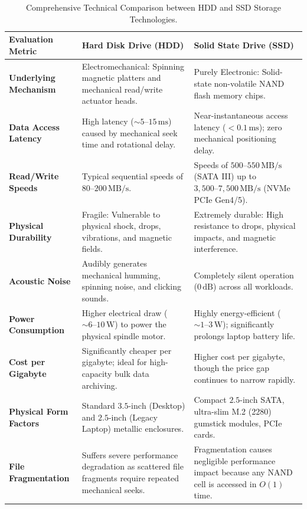 \begin{table}[htbp]
\centering
\small
\renewcommand{\arraystretch}{1.3}
\begin{tabularx}{\linewidth}{l>{\raggedright\arraybackslash}X>{\raggedright\arraybackslash}X}
\toprule
\textbf{Evaluation Metric} & \textbf{Hard Disk Drive (HDD)} & \textbf{Solid State Drive (SSD)} \\
\midrule
\textbf{Underlying Mechanism} & Electromechanical: Spinning magnetic platters and mechanical read/write actuator heads. & Purely Electronic: Solid-state non-volatile NAND flash memory chips. \\
\textbf{Data Access Latency} & High latency ($\sim 5\text{--}15\,\text{ms}$) caused by mechanical seek time and rotational delay. & Near-instantaneous access latency ($< 0.1\,\text{ms}$); zero mechanical positioning delay. \\
\textbf{Read/Write Speeds} & Typical sequential speeds of $80\text{--}200\,\text{MB/s}$. & Speeds of $500\text{--}550\,\text{MB/s}$ (SATA III) up to $3{,}500\text{--}7{,}500\,\text{MB/s}$ (NVMe PCIe Gen4/5). \\
\textbf{Physical Durability} & Fragile: Vulnerable to physical shock, drops, vibrations, and magnetic fields. & Extremely durable: High resistance to drops, physical impacts, and magnetic interference. \\
\textbf{Acoustic Noise} & Audibly generates mechanical humming, spinning noise, and clicking sounds. & Completely silent operation ($0\,\text{dB}$) across all workloads. \\
\textbf{Power Consumption} & Higher electrical draw ($\sim 6\text{--}10\,\text{W}$) to power the physical spindle motor. & Highly energy-efficient ($\sim 1\text{--}3\,\text{W}$); significantly prolongs laptop battery life. \\
\textbf{Cost per Gigabyte} & Significantly cheaper per gigabyte; ideal for high-capacity bulk data archiving. & Higher cost per gigabyte, though the price gap continues to narrow rapidly. \\
\textbf{Physical Form Factors} & Standard $3.5\text{-inch}$ (Desktop) and $2.5\text{-inch}$ (Legacy Laptop) metallic enclosures. & Compact $2.5\text{-inch}$ SATA, ultra-slim M.2 (2280) gumstick modules, PCIe cards. \\
\textbf{File Fragmentation} & Suffers severe performance degradation as scattered file fragments require repeated mechanical seeks. & Fragmentation causes negligible performance impact because any NAND cell is accessed in $O(1)$ time. \\
\bottomrule
\end{tabularx}
\caption{Comprehensive Technical Comparison between HDD and SSD Storage Technologies.}
\label{tab:ssd-vs-hdd}
\end{table}

